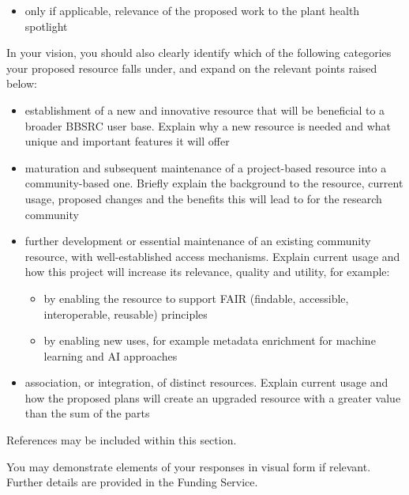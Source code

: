 \documentclass[12in]{article}
\begin{document}
{\begin{itemize}
\item only if applicable, relevance of the proposed work to the plant health spotlight

\end{itemize}

In your vision, you should also clearly identify which of the following categories
your proposed resource falls under, and expand on the relevant points raised
below:

\begin{itemize}

\item establishment of a new and innovative resource that will be beneficial to a
broader BBSRC user base. Explain why a new resource is needed and what
unique and important features it will offer
\item maturation and subsequent maintenance of a project-based resource into a
community-based one. Briefly explain the background to the resource,
current usage, proposed changes and the benefits this will lead to for the
research community
\item further development or essential maintenance of an existing community
resource, with well-established access mechanisms. Explain current usage
and how this project will increase its relevance, quality and utility, for
example:

\begin{itemize}

\item by enabling the resource to support FAIR (findable, accessible,
interoperable, reusable) principles
\item by enabling new uses, for example metadata enrichment for machine
learning and AI approaches

\end{itemize}

\item association, or integration, of distinct resources. Explain current usage and
how the proposed plans will create an upgraded resource with a greater
value than the sum of the parts

\end{itemize}

References may be included within this section.

You may demonstrate elements of your responses in visual form if relevant.
Further details are provided in the Funding Service.
}



\pagebreak
\end{document}
